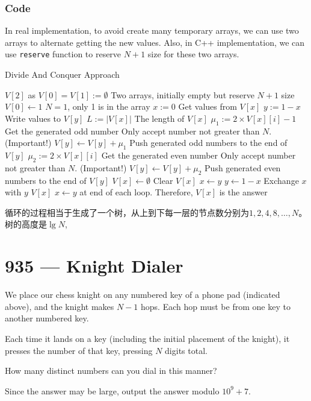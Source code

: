\documentclass[a4paper,12pt]{article}
\begin{document}
\subsubsection{Code}
In real implementation, to avoid create many temporary arrays, we can use two arrays to alternate getting the new values. Also, in C++ implementation, we can use \texttt{reserve} function to reserve $N+1$ size for these two arrays.
\setcounter{algorithm}{0}
\begin{algorithm}[H]
\caption{Divide And Conquer Approach}
\begin{algorithmic}[1]
\State $V[2]$ as $V[0]=V[1]:=\emptyset$ \Comment Two arrays, initially empty but reserve $N+1$ size
\State $V[0]\gets 1$ \Comment $N=1$, only 1 is in the array
\State $x:=0$ \Comment Get values from $V[x]$
\State $y:=1-x$ \Comment Write values to $V[y]$
\State $L:=\vert V[x]\vert$ \Comment The length of $V[x]$
\State $\mu_1:=2\times V[x][i] - 1$ \Comment Get the generated odd number
 \Comment Only accept number not greater than $N$. (Important!)
\State $V[y] \gets V[y] + \mu_1$ \Comment Push generated odd numbers to the end of $V[y]$
\EndIf
\EndFor
{}
\State $\mu_2:=2\times V[x][i]$ \Comment Get the generated even number
 \Comment Only accept number not greater than $N$. (Important!)
\State $V[y] \gets V[y] + \mu_2$ \Comment Push generated even numbers to the end of $V[y]$
\EndIf
\State $V[x] \gets \emptyset$ \Comment Clear $V[x]$
\State $x\gets y$ 
\State $y\gets 1-x$ \Comment  Exchange $x$ with $y$
\EndFor
\EndWhile
\State \Return $V[x]$ \Comment $x\gets y$ at end of each loop. Therefore, $V[x]$ is the answer
\EndProcedure
\end{algorithmic}
\end{algorithm}
\begin{CJK*}{UTF8}{gbsn}
循环的过程相当于生成了一个树，从上到下每一层的节点数分别为$1,2,4,8,\ldots,N$。 树的高度是$\lg N$,
\end{CJK*}

\section{935 --- Knight Dialer}
We place our chess knight on any numbered key of a phone pad (indicated above), and the knight makes $N-1$ hops.  Each hop must be from one key to another numbered key.
\par
Each time it lands on a key (including the initial placement of the knight), it presses the number of that key, pressing $N$ digits total.
\par
How many distinct numbers can you dial in this manner?
\par
Since the answer may be large, output the answer modulo $10^9 + 7$.
\end{document}
